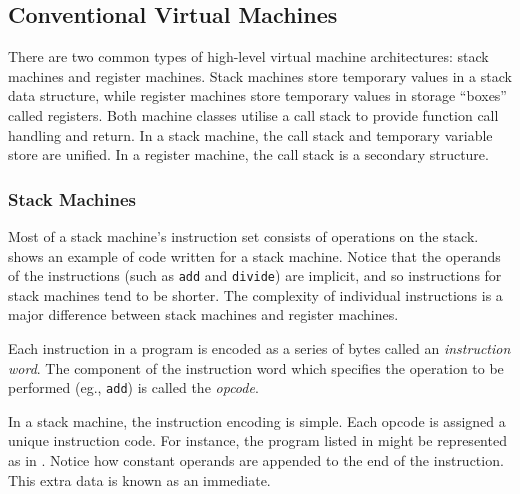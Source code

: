 		\subsection{Conventional Virtual Machines}
			There are two common types of high-level virtual machine architectures: stack machines and register machines. Stack machines store temporary values in a stack data structure, while register machines store temporary values in storage ``boxes'' called registers. Both machine classes utilise a call stack to provide function call handling and return. In a stack machine, the call stack and temporary variable store are unified. In a register machine, the call stack is a secondary  structure.
			
			\subsubsection{Stack Machines}
			Most of a stack machine's instruction set consists of operations on the stack.  shows an example of code written for a stack machine. Notice that the operands of the instructions (such as \texttt{add} and \texttt{divide}) are implicit, and so instructions for stack machines tend to be shorter. The complexity of individual instructions is a major difference between stack machines and register machines. 
			
			Each instruction in a program is encoded as a series of bytes called an \emph{instruction word}. The component of the instruction word which specifies the operation to be performed (eg., \texttt{add}) is called the \emph{opcode}. 
			
			In a stack machine, the instruction encoding is simple. Each opcode is assigned a unique instruction code. For instance, the program listed in  might be represented as in . Notice how constant operands are appended to the end of the instruction. This extra data is known as an immediate.
			
